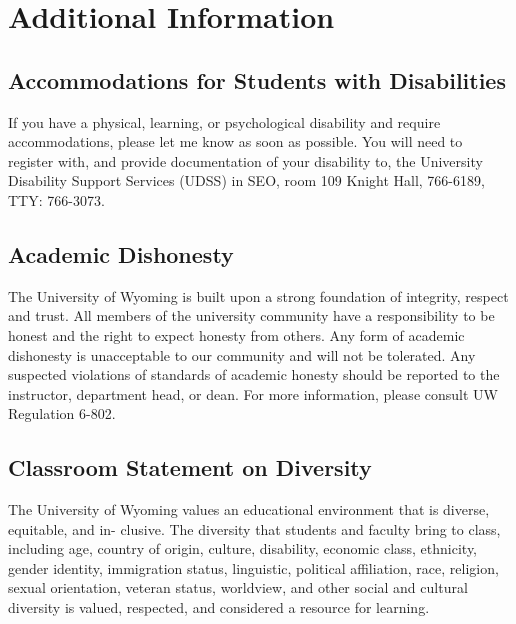 \documentclass[11pt, letterpaper]{article}
\begin{document}
\section*{Additional Information}
\subsection*{Accommodations for Students with Disabilities} If you have a physical, learning, or psychological disability and require accommodations, please let me know as soon as possible. You will need to register with, and provide documentation of your disability to, the University Disability Support Services (UDSS) in SEO, room 109 Knight Hall, 766-6189, TTY: 766-3073.

\subsection*{Academic Dishonesty} The University of Wyoming is built upon a strong foundation of integrity, respect and trust. All members of the university community have a responsibility to be honest and the right to expect honesty from others. Any form of academic dishonesty is unacceptable to our community and will not be tolerated. Any suspected violations of standards of academic honesty should be reported to the instructor, department head, or dean. For more information, please consult UW Regulation 6-802.

\subsection*{Classroom Statement on Diversity} The University of Wyoming values an educational environment that is diverse, equitable, and in- clusive. The diversity that students and faculty bring to class, including age, country of origin, culture, disability, economic class, ethnicity, gender identity, immigration status, linguistic, political affiliation, race, religion, sexual orientation, veteran status, worldview, and other social and cultural diversity is valued, respected, and considered a resource for learning.
\end{document}
